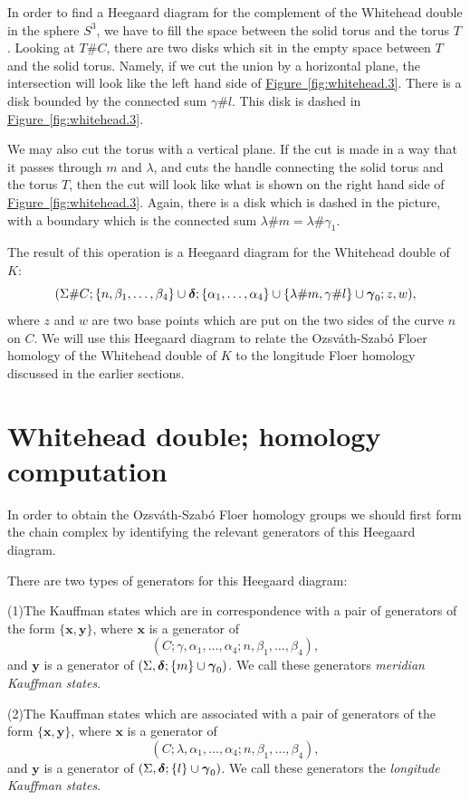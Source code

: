 \documentclass{gtart_h}
\def\figref#1{\hyperlink{#1anchor}{Figure~\ref*{#1}}}
\theoremstyle{definition}
\newcommand\x{\mathbf x}
\newcommand\y{\mathbf y}
\newcommand\gammas{\mbox{\boldmath$\gamma$}}
\newcommand\deltas{\mbox{\boldmath$\delta$}}
\begin{document}
In order to find a Heegaard diagram for the complement of the Whitehead double
in the sphere $S^3$, we have to fill the space between the solid torus and the
torus $T$. Looking at $T\#C$, there are two disks which sit in the empty space
between $T$ and the solid torus. Namely, if we cut the union by a horizontal plane,
the intersection will look like the left hand side of \figref{fig:whitehead.3}.
There is a disk bounded by the connected sum $\gamma\# l$. This disk is
dashed in \figref{fig:whitehead.3}.

We may also cut the torus with a vertical plane. If the cut is made in a way that it passes
through $m$ and $\lambda$,
and cuts the handle connecting the
solid torus and the torus $T$,  then the cut will look like what is shown on the right
hand side of \figref{fig:whitehead.3}. Again, there is a disk which is dashed in
the picture,
with a  boundary which is the connected sum $\lambda \#m=\lambda\#\gamma_1$.


The result of this operation is a Heegaard diagram for the Whitehead double of $K$:
$$
(\Sigma\#C;\{n,\beta_1,\ldots,\beta_4\}\cup \deltas;\{\alpha_1,\ldots,\alpha_4\}\cup
\{\lambda\#m,\gamma\# l\}\cup \gammas_0;z,w),
$$
where $z$ and $w$ are two base points which are put on the two sides of the curve $n$ on $C$.
We will use this Heegaard diagram to relate the Ozsv\'ath-Szab\'o Floer homology
of the Whitehead double of $K$ to the longitude Floer homology discussed in the
earlier sections.

\section{Whitehead double; homology computation}
In order to obtain the Ozsv\'ath-Szab\'o Floer homology groups we should first form the
chain complex by identifying the relevant generators of this Heegaard diagram.

There are two types of generators for this Heegaard diagram:

(1)\qua The Kauffman states which are in correspondence with a pair of
generators of the form $\{\x,\y\}$, where $\x$
is a generator of $$(C;\gamma,\alpha_1,\ldots,\alpha_4;n,\beta_1,\ldots,\beta_4),$$ and
$\y$ is a generator of $(\Sigma,\deltas;\{m\}\cup \gammas_0)$.
We call these generators \emph{meridian Kauffman states}.

(2)\qua The Kauffman states which are associated with a pair of generators of the form $\{\x,\y\}$, where $\x$
is a generator of $$(C;\lambda,\alpha_1,\ldots,\alpha_4;n,\beta_1,\ldots,\beta_4),$$ and
$\y$ is a generator of $(\Sigma,\deltas;\{l\}\cup \gammas_0)$.
We call these generators the \emph{longitude Kauffman states}.
\end{document}

